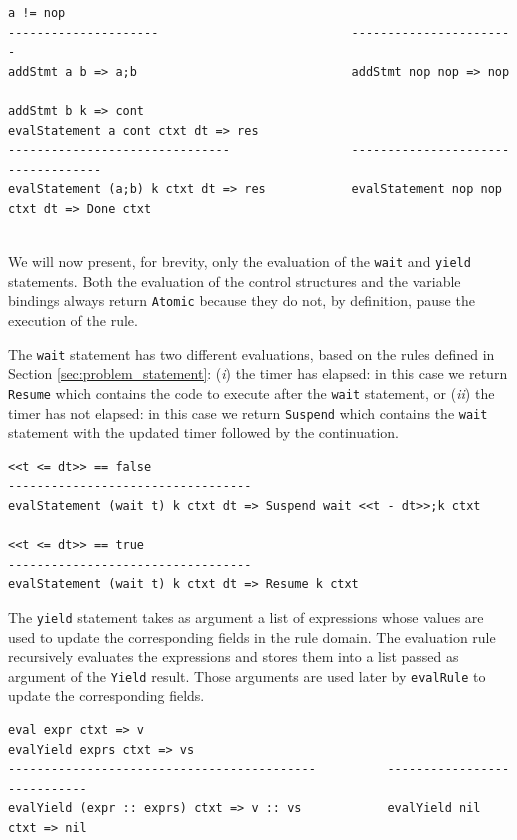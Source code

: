 \begin{lstlisting}
a != nop
---------------------                           ----------------------- 
addStmt a b => a;b                              addStmt nop nop => nop   

addStmt b k => cont
evalStatement a cont ctxt dt => res
-------------------------------                 -----------------------------------       
evalStatement (a;b) k ctxt dt => res            evalStatement nop nop ctxt dt => Done ctxt


\end{lstlisting}

\noindent
We will now present, for brevity, only the evaluation of the \texttt{wait} and \texttt{yield} statements. Both the evaluation of the control structures and the variable bindings always return \texttt{Atomic} because they do not, by definition, pause the execution of the rule.

The \texttt{wait} statement has two different evaluations, based on the rules defined in Section \ref{sec:problem_statement}: (\textit{i}) the timer has elapsed: in this case we return \texttt{Resume} which contains the code to execute after the \texttt{wait} statement, or (\textit{ii}) the timer has not elapsed: in this case we return \texttt{Suspend} which contains the \texttt{wait} statement with the updated timer followed by the continuation.


\begin{lstlisting}
<<t <= dt>> == false
----------------------------------
evalStatement (wait t) k ctxt dt => Suspend wait <<t - dt>>;k ctxt

<<t <= dt>> == true
----------------------------------
evalStatement (wait t) k ctxt dt => Resume k ctxt
\end{lstlisting}

\noindent
The \texttt{yield} statement takes as argument a list of expressions whose values are used to update the corresponding fields in the rule domain. The evaluation rule recursively evaluates the expressions and stores them into a list passed as argument of the \texttt{Yield} result. Those arguments are used later by \texttt{evalRule} to update the corresponding fields.

\begin{lstlisting}
eval expr ctxt => v
evalYield exprs ctxt => vs
-------------------------------------------          ----------------------------
evalYield (expr :: exprs) ctxt => v :: vs            evalYield nil ctxt => nil
\end{lstlisting}

